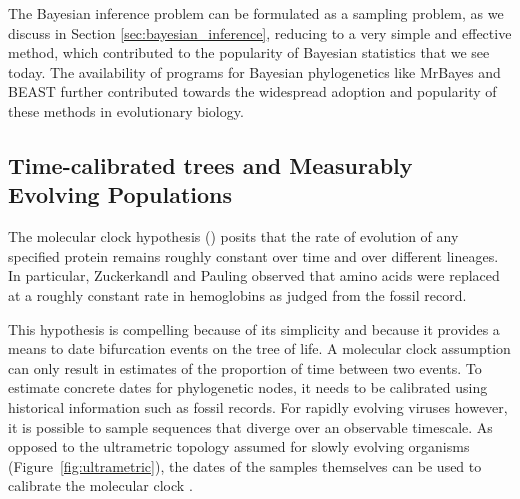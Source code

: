 The Bayesian inference problem can be formulated as a sampling problem, as we discuss in Section \ref{sec:bayesian_inference}, reducing to a very simple and effective method, which contributed to the popularity of Bayesian statistics that we see today. 
The availability of programs for Bayesian phylogenetics like MrBayes \citep{Huelsenbeck2001} and BEAST \citep{Drummond2012} further contributed towards the widespread adoption and popularity of these methods in evolutionary biology.

\subsection{Time-calibrated trees and Measurably Evolving Populations\label{sub:clocks}}

The molecular clock hypothesis (\cite{Zuckerkandl1962}) posits that the rate of evolution of any specified protein remains roughly constant over time and over different lineages.
In particular, Zuckerkandl and Pauling observed that amino acids were replaced at a roughly constant rate in hemoglobins as judged from the fossil record.


This hypothesis is compelling because of its simplicity and because it provides a means to date bifurcation events on the tree of life.
A molecular clock assumption can only result in estimates of the proportion of time between two events. 
To estimate concrete dates for phylogenetic nodes, it needs to be calibrated using historical information such as  fossil records.
For rapidly evolving viruses however, it is possible to sample sequences that diverge over an observable timescale. 
As opposed to the ultrametric topology assumed for slowly evolving organisms (Figure~\ref{fig:ultrametric}), the dates of the samples themselves can be used to calibrate the molecular clock \citep{Rambaut2000}.


